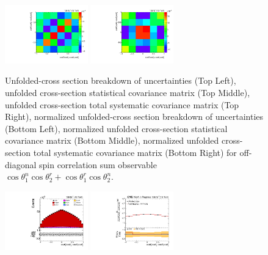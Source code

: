 \begin{refsection}
\begin{figure}[htb]
\begin{center}
 \includegraphics[width=0.32\textwidth]{fig_fullRun2UL/unfolding/combined/StatCovMatrixNorm_rebinnedB_c_Pnr.pdf}
 \includegraphics[width=0.32\textwidth]{fig_fullRun2UL/unfolding/combined/TotalSystCovMatrixNorm_rebinnedB_c_Pnr.pdf} \\
\caption{Unfolded-cross section breakdown of uncertainties (Top Left), unfolded cross-section statistical covariance matrix (Top Middle), unfolded cross-section total systematic covariance matrix (Top Right), normalized unfolded-cross section breakdown of uncertainties (Bottom Left), normalized unfolded cross-section statistical covariance matrix (Bottom Middle), normalized unfolded cross-section total systematic covariance matrix (Bottom Right) for off-diagonal spin correlation sum observable $\cos\theta_{1}^{n}\cos\theta_{2}^{r}+\cos\theta_{1}^{r}\cos\theta_{2}^{n}$.}
\label{fig:c_Pnr_uncertainties}
\end{center}
\end{figure}
\clearpage
\begin{figure}[htb]
\begin{center}
 \includegraphics[width=0.32\textwidth]{fig_fullRun2UL/controlplots/combined/Hyp_LLBarCMnr.pdf}
 \includegraphics[width=0.32\textwidth]{fig_fullRun2UL/unfolding/combined/UnfoldedResults_c_Mnr.pdf}

\end{center}
\end{figure}
\end{refsection}
